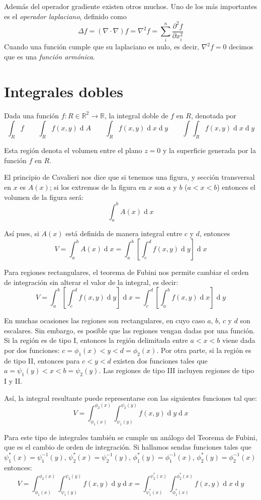 \documentclass[a4paper]{article}
\renewcommand{\d}[1]{\ensuremath{\operatorname{d}\!{#1}}}
\begin{document}
Además del operador gradiente existen otros muchos. Uno de los más importantes es el \textit{operador laplaciano}, definido como
\[ \Delta f = (\nabla\cdot\nabla)f = \nabla^2f = \sum^n_i\frac{\partial^2f}{\partial x_i^2} \]
Cuando una función cumple que su laplaciano es nulo, es decir, $\nabla^2f = 0$ decimos que es una \textit{función armónica}.

\section{Integrales dobles}
Dada una función $f: R \in \mathbb{R}^2 \rightarrow \mathbb{R}$, la integral doble de $f$ en $R$, denotada por 
\[\int_R f \qquad \int_R f(x,y) \d{A} \qquad \int_R f(x,y) \d{x}\d{y} \qquad \int\int_Rf(x,y) \d{x}\d{y} \]

Esta región denota el volumen entre el plano $z=0$ y la superficie generada por la función $f$ en $R$.

El principio de Cavalieri nos dice que si tenemos una figura, y sección transversal en $x$ es $A(x)$; si los extremos de la figura en $x$ son $a$ y $b$ ($a<x<b$)  entonces el volumen de la figura será:
\[ \int_a^b A(x) \d{x} \]

Así pues, si $A(x)$ está definida de manera integral entre $c$ y $d$, entonces
\[V = \int_a^b A(x) \d{x} = \int_a^b\left[\int_c^d f(x,y) \d{y}\right]\d{x} \]

Para regiones rectangulares, el teorema de Fubini nos permite cambiar el orden de integración sin alterar el valor de la integral, es decir:
\[V = \int_a^b\left[\int_c^d f(x,y) \d{y}\right]\d{x} =  \int_c^d\left[\int_a^b f(x,y) \d{x}\right]\d{y} \]

En muchas ocasiones las regiones son rectangulares, en cuyo caso $a$, $b$, $c$ y $d$ son escalares. Sin embargo, es posible que las regiones vengan dadas por una función. Si la región es de tipo I, entonces la región delimitada entre $a < x < b$ viene dada por dos funciones: $c = \phi_1(x) < y < d = \phi_2(x)$. Por otra parte, si la región es de tipo II, entonces para $c < y < d$ existen dos funciones tales que $a = \psi_1(y) < x < b=\psi_2(y)$. Las regiones de tipo III incluyen regiones de tipo I y II.

Así, la integral resultante puede representarse con las siguientes funciones tal que:
\[V = \int_{\phi_1(x)}^{\phi_2(x)}\int_{\psi_1(y)}^{\psi_2(y)} f(x,y) \d{y}\d{x}  \]

Para este tipo de integrales también se cumple un análogo del Teorema de Fubini, que es el cambio de orden de integración. Si hallamos sendas funciones tales que $\psi^*_1(x) = \psi_1^{-1}(y)$, $\psi^*_2(x) = \psi_2^{-1}(y)$, $\phi^*_1(y) = \phi_1^{-1}(x)$, $\phi^*_2(y) = \phi_2^{-1}(x)$ entonces:
\[V = \int_{\phi_1(x)}^{\phi_2(x)}\int_{\psi_1(y)}^{\psi_2(y)} f(x,y) \d{y}\d{x} =  \int_{\psi_1^*(x)}^{\psi_2^*(x)}\int_{\phi_1^*(x)}^{\phi_2^*(x)} f(x,y) \d{x}\d{y} \]
\end{document}
